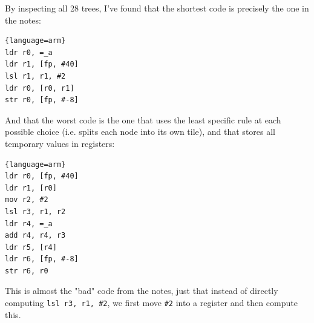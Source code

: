 By inspecting all 28 trees, I've found that the shortest code is precisely the one in the notes:

\begin{lstlisting}{language=arm}
ldr r0, =_a
ldr r1, [fp, #40]
lsl r1, r1, #2
ldr r0, [r0, r1]
str r0, [fp, #-8]
\end{lstlisting}

And that the worst code is the one that uses the least specific rule at each possible choice (i.e. splits each node into its own tile), and that stores all temporary values in registers:

\begin{lstlisting}{language=arm}
ldr r0, [fp, #40]
ldr r1, [r0]
mov r2, #2
lsl r3, r1, r2
ldr r4, =_a
add r4, r4, r3
ldr r5, [r4]
ldr r6, [fp, #-8]
str r6, r0
\end{lstlisting}

This is almost the "bad" code from the notes, just that instead of directly computing \texttt{lsl r3, r1, \#2}, we first move \texttt{\#2} into a register and then compute this.
